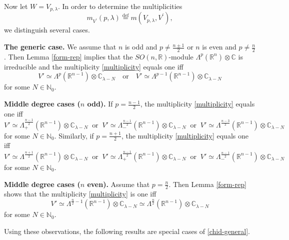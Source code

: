 \documentclass[a4paper,12pt,reqno]{amsart}
\numberwithin{theorem}{subsection}
\numberwithin{equation}{section}
\begin{document}
Now let $W = V_{p,\lambda}$. In order to determine the multiplicities
\begin{equation}\label{multiplicity}
   m_{V^\prime}(p,\lambda) {\stackrel{\text{def}}{=}} m(V_{p,\lambda},V^\prime),
\end{equation}
we distinguish several cases.

{\bf The generic case.} We assume that $n$ is odd and $p \ne \frac{n\pm 1}{2}$
or $n$ is even and $p \ne \frac{n}{2}$. Then Lemma \ref{form-rep} implies that
the $SO(n,{\mathbb{R}})$-module $\Lambda^{p}({\mathbb{R}}^{n}) \otimes {\mathbb{C}}$ is irreducible and the
multiplicity \eqref{multiplicity} equals one iff
$$
   V' \simeq \Lambda^p({\mathbb{R}}^{n-1}) \otimes {\mathbb{C}}_{\lambda-N} \quad \mbox{or} \quad
   V' \simeq  \Lambda^{p-1}({\mathbb{R}}^{n-1}) \otimes {\mathbb{C}}_{\lambda-N}
$$
for some $N \in {\mathbb{N}}_0$.

{\bf Middle degree cases ($n$ odd).} If $p=\frac{n-1}{2}$, the multiplicity
\eqref{multiplicity} equals one iff
$$
   V' \simeq \Lambda_+^\frac{n-1}{2}({\mathbb{R}}^{n-1}) \otimes {\mathbb{C}}_{\lambda-N} \;\; \mbox{or} \;\;
   V' \simeq  \Lambda_-^\frac{n-1}{2}({\mathbb{R}}^{n-1}) \otimes {\mathbb{C}}_{\lambda-N} \;\; \mbox{or} \;\;
   V' \simeq  \Lambda^\frac{n-3}{2}({\mathbb{R}}^{n-1}) \otimes {\mathbb{C}}_{\lambda-N}
$$
for some $N \in {\mathbb{N}}_0$. Similarly, if $p=\frac{n+1}{2}$, the multiplicity
\eqref{multiplicity} equals one iff
$$
   V' \simeq \Lambda^\frac{n+1}{2}({\mathbb{R}}^{n-1}) \otimes {\mathbb{C}}_{\lambda-N} \;\; \mbox{or} \;\;
   V' \simeq  \Lambda_+^\frac{n-1}{2}({\mathbb{R}}^{n-1}) \otimes {\mathbb{C}}_{\lambda-N} \;\; \mbox{or} \;\;
   V' \simeq  \Lambda_-^\frac{n-1}{2}({\mathbb{R}}^{n-1}) \otimes {\mathbb{C}}_{\lambda-N}
$$
for some $N \in {\mathbb{N}}_0$.

{\bf Middle degree cases ($n$ even).} Assume that $p = \frac{n}{2}$. Then Lemma
\ref{form-rep} shows that the multiplicity \eqref{multiplicity} is one iff
$$
   V' \simeq \Lambda^{\frac{n}{2}-1}({\mathbb{R}}^{n-1}) \otimes {\mathbb{C}}_{\lambda-N} \simeq
   \Lambda^{\frac{n}{2}}({\mathbb{R}}^{n-1}) \otimes {\mathbb{C}}_{\lambda-N}
$$
for some $N \in {\mathbb{N}}_0$.

Using these observations, the following results are special cases of
\eqref{chid-general}.
\end{document}
